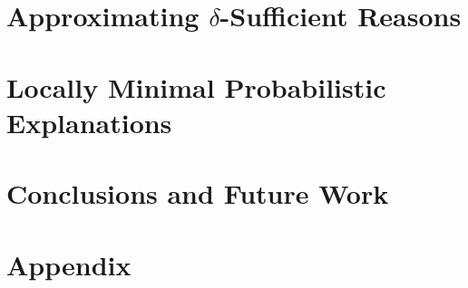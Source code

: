 \documentclass[letterpaper]{article} %
\begin{document}
\section{Approximating $\delta$-Sufficient Reasons}
\label{sec-comp-problem}


\section{Locally Minimal Probabilistic Explanations}
\label{sec-loc-min}


\section{Conclusions and Future Work}
\label{sec-conclusions}




\newpage
\onecolumn
\appendix
\section*{Appendix}


\end{document}
